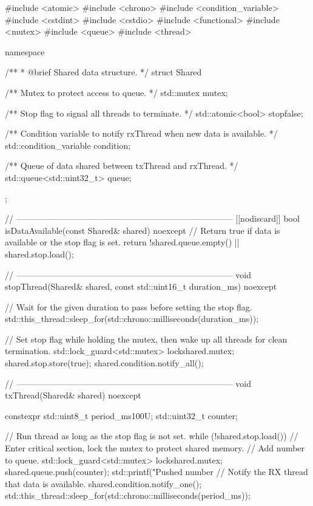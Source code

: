 \begin{cppcode}
#include <atomic>
#include <chrono>
#include <condition_variable>
#include <cstdint>
#include <cstdio>
#include <functional>
#include <mutex>
#include <queue>
#include <thread>

namespace
{
/**
 * @brief Shared data structure.
 */
struct Shared
{
    /** Mutex to protect access to queue. */
    std::mutex mutex{};

    /** Stop flag to signal all threads to terminate. */
    std::atomic<bool> stop{false};

    /** Condition variable to notify rxThread when new data is available. */
    std::condition_variable condition{};

    /** Queue of data shared between txThread and rxThread. */
    std::queue<std::uint32_t> queue{};
};

// -----------------------------------------------------------------------------
[[nodiscard]] bool isDataAvailable(const Shared& shared) noexcept
{
    // Return true if data is available or the stop flag is set.
    return !shared.queue.empty() || shared.stop.load();
}

// -----------------------------------------------------------------------------
void stopThread(Shared& shared, const std::uint16_t duration_ms) noexcept
{
    // Wait for the given duration to pass before setting the stop flag.
    std::this_thread::sleep_for(std::chrono::milliseconds(duration_ms));

    // Set stop flag while holding the mutex, then wake up all threads for clean termination.
    {
        std::lock_guard<std::mutex> lock{shared.mutex};
        shared.stop.store(true);
    }
    shared.condition.notify_all();
}

// -----------------------------------------------------------------------------
void txThread(Shared& shared) noexcept
{
    constexpr std::uint8_t period_ms{100U};
    std::uint32_t counter{};

    // Run thread as long as the stop flag is not set.
    while (!shared.stop.load())
    {
        // Enter critical section, lock the mutex to protect shared memory.
        {
            // Add number to queue.
            std::lock_guard<std::mutex> lock{shared.mutex};
            shared.queue.push(counter);
            std::printf("Pushed number %
        }
        // Notify the RX thread that data is available.
        shared.condition.notify_one();
        std::this_thread::sleep_for(std::chrono::milliseconds(period_ms));
    }
}

}
\end{cppcode}
